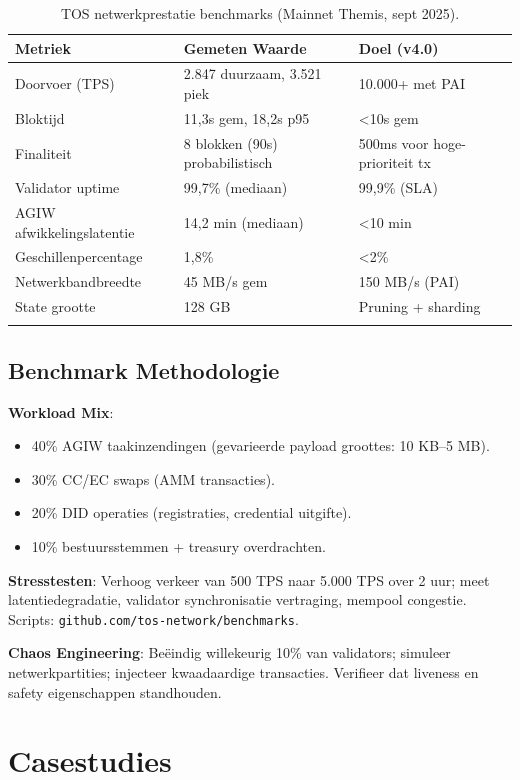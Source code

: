\documentclass[11pt]{article}
\begin{document}
\begin{longtable}{@{}p{}p{}p{}@{}}
\toprule
\textbf{Metriek} & \textbf{Gemeten Waarde} & \textbf{Doel (v4.0)} \\\midrule
Doorvoer (TPS) & 2.847 duurzaam, 3.521 piek & 10.000+ met PAI \\
Bloktijd & 11,3s gem, 18,2s p95 & <10s gem \\
Finaliteit & 8 blokken (90s) probabilistisch & 500ms voor hoge-prioriteit tx \\
Validator uptime & 99,7\% (mediaan) & 99,9\% (SLA) \\
AGIW afwikkelingslatentie & 14,2 min (mediaan) & <10 min \\
Geschillenpercentage & 1,8\% & <2\% \\
Netwerkbandbreedte & 45 MB/s gem & 150 MB/s (PAI) \\
State grootte & 128 GB & Pruning + sharding \\
\bottomrule
\caption{TOS netwerkprestatie benchmarks (Mainnet Themis, sept 2025).}
\end{longtable}

\subsection{Benchmark Methodologie}

\textbf{Workload Mix}:
\begin{itemize}[noitemsep]
  \item 40\% AGIW taakinzendingen (gevarieerde payload groottes: 10 KB--5 MB).
  \item 30\% CC/EC swaps (AMM transacties).
  \item 20\% DID operaties (registraties, credential uitgifte).
  \item 10\% bestuursstemmen + treasury overdrachten.
\end{itemize}

\textbf{Stresstesten}: Verhoog verkeer van 500 TPS naar 5.000 TPS over 2 uur; meet latentiedegradatie, validator synchronisatie vertraging, mempool congestie. Scripts: \texttt{github.com/tos-network/benchmarks}.

\textbf{Chaos Engineering}: Beëindig willekeurig 10\% van validators; simuleer netwerkpartities; injecteer kwaadaardige transacties. Verifieer dat liveness en safety eigenschappen standhouden.

\section{Casestudies}
\label{sec:case-studies}
\end{document}
